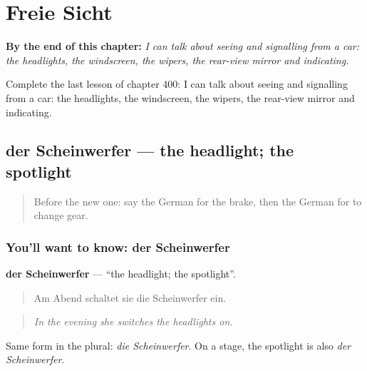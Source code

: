 
\chapter{Freie Sicht}
\label{ch:ge-freie-sicht}

\begin{chapteropening}
\textbf{By the end of this chapter:} \emph{I can talk about seeing and signalling from a car: the headlights, the windscreen, the wipers, the rear-view mirror and indicating.}

Complete the last lesson of chapter 400: I can talk about seeing and signalling from a car: the headlights, the windscreen, the wipers, the rear-view mirror and indicating.
\end{chapteropening}

\section[der Scheinwerfer]{der Scheinwerfer — the headlight; the spotlight}

\label{lesson:GE-C400-scheinwerfer}



\begin{quote}
Before the new one: say the German for the brake, then the German for to change gear.
\end{quote}

\subsection*{You'll want to know: der Scheinwerfer}
\textbf{der Scheinwerfer} — \textquotedblleft{}the headlight; the spotlight\textquotedblright{}.

\begin{quote}
Am Abend schaltet sie die Scheinwerfer ein.
\end{quote}

\begin{quote}
\emph{In the evening she switches the headlights on.}
\end{quote}

Same form in the plural: \emph{die Scheinwerfer}. On a stage, the spotlight is also \emph{der Scheinwerfer}.

